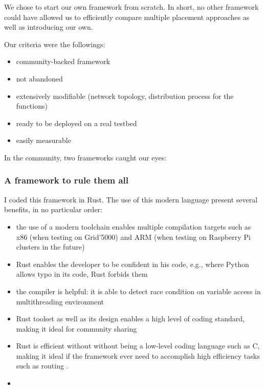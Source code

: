 \documentclass[11pt]{sdm}
\begin{document}
We chose to start our own framework from scratch. In short, no other framework could have allowed us to efficiently compare multiple placement approaches as well as introducing our own.

Our criteria were the followings:
\begin{itemize}
	\item community-backed framework
	\item not abandoned
	\item extensively modifiable (network topology, distribution process for the functions)
	\item ready to be deployed on a real testbed
	\item easily measurable
\end{itemize}

In the community, two frameworks caught our eyes:
\begin{description}
	\item[\cite{deng_fogbus2_2021}]{
	}
	\item[\cite{smartfog_fogflow_2022}]{}
\end{description}

\subsubsection{A framework to rule them all}

I coded this framework in Rust. The use of this modern language present several benefits, in no particular order:
\begin{itemize}
	\item the use of a modern toolchain enables multiple compilation targets such as x86 (when testing on Grid'5000) and ARM (when testing on Raspberry Pi clusters in the future)
	\item Rust enables the developer to be confident in his code, e.g., where Python allows typo in its code, Rust forbids them
	\item the compiler is helpful: it is able to detect race condition on variable access in multithreading environment
	\item Rust toolset as well as its design enables a high level of coding standard, making it ideal for community sharing
	\item Rust is efficient without without being a low-level coding language such as C, making it ideal if the framework ever need to accomplish high efficiency tasks such as routing .
	\item 
\end{itemize}
\end{document}
